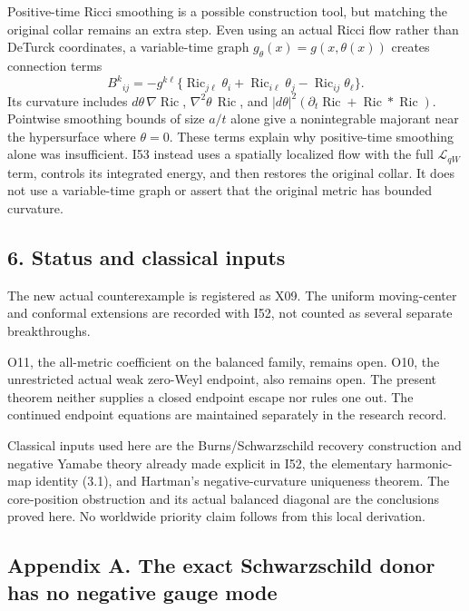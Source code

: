 \documentclass[
  10pt,
]{article}
\begin{document}
Positive-time Ricci smoothing is a possible construction tool, but
matching the original collar remains an extra step. Even using an actual
Ricci flow rather than DeTurck coordinates, a variable-time graph
\(g_\theta(x)=g(x,\theta(x))\) creates connection terms \[
 B^k{}_{ij}
 =-g^{k\ell}\{\operatorname{Ric}_{j\ell}\theta_i
             +\operatorname{Ric}_{i\ell}\theta_j
             -\operatorname{Ric}_{ij}\theta_\ell\}.            \tag{5.3}
\] Its curvature includes \(d\theta\,\nabla\operatorname{Ric}\),
\(\nabla^2\theta\,\operatorname{Ric}\), and
\(|d\theta|^2(\partial_t\operatorname{Ric}  +\operatorname{Ric}*\operatorname{Ric})\).
Pointwise smoothing bounds of size \(a/t\) alone give a nonintegrable
majorant near the hypersurface where \(\theta=0\). These terms explain
why positive-time smoothing alone was insufficient. I53 instead uses a
spatially localized flow with the full \(\mathcal L_{qW}\) term,
controls its integrated energy, and then restores the original collar.
It does not use a variable-time graph or assert that the original metric
has bounded curvature.

\hypertarget{status-and-classical-inputs}{%
\subsection{6. Status and classical
inputs}\label{status-and-classical-inputs}}

The new actual counterexample is registered as X09. The uniform
moving-center and conformal extensions are recorded with I52, not
counted as several separate breakthroughs.

O11, the all-metric coefficient on the balanced family, remains open.
O10, the unrestricted actual weak zero-Weyl endpoint, also remains open.
The present theorem neither supplies a closed endpoint escape nor rules
one out. The continued endpoint equations are maintained separately in
the research record.

Classical inputs used here are the Burns/Schwarzschild recovery
construction and negative Yamabe theory already made explicit in I52,
the elementary harmonic-map identity (3.1), and Hartman's
negative-curvature uniqueness theorem. The core-position obstruction and
its actual balanced diagonal are the conclusions proved here. No
worldwide priority claim follows from this local derivation.

\hypertarget{appendix-a.-the-exact-schwarzschild-donor-has-no-negative-gauge-mode}{%
\subsection{Appendix A. The exact Schwarzschild donor has no negative
gauge
mode}\label{appendix-a.-the-exact-schwarzschild-donor-has-no-negative-gauge-mode}}
\end{document}
